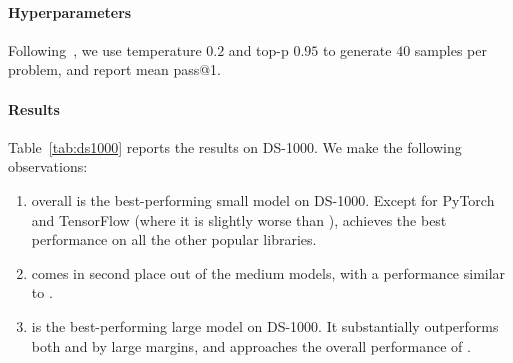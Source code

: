 \documentclass[10pt]{article} %
\begin{document}
\paragraph{Hyperparameters} Following~\citet{pmlr-v202-lai23b}, we use temperature $0.2$ and top-p $0.95$ to generate $40$ samples per problem, and report mean pass@1.

\paragraph{Results} Table~\ref{tab:ds1000} reports the results on DS-1000. We make the following observations:

\begin{enumerate}
    \item {} overall is the best-performing small model on DS-1000. Except for PyTorch and TensorFlow (where it is slightly worse than ),  achieves the best performance on all the other popular libraries. 
    \item {} comes in second place out of the medium models, with a performance similar to .
    \item {} is the best-performing large model on DS-1000. It substantially outperforms both  and  by large margins, and approaches the overall performance of .
\end{enumerate}
\end{document}

